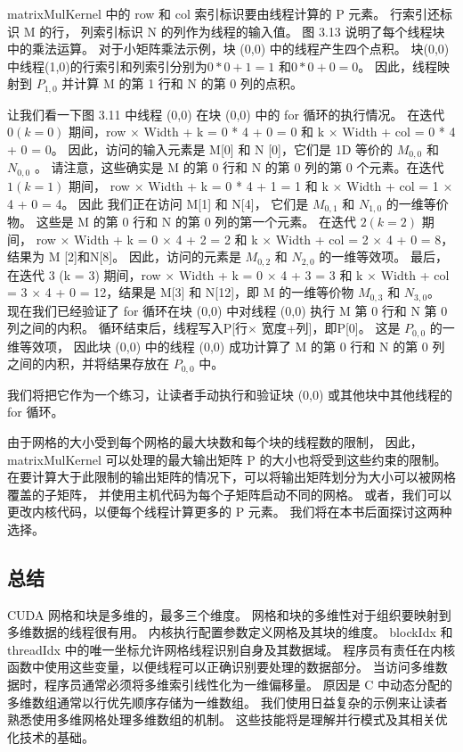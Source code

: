 matrixMulKernel 中的 row 和 col 索引标识要由线程计算的 P 元素。 行索引还标识 M 的行，
列索引标识 N 的列作为线程的输入值。 图 3.13 说明了每个线程块中的乘法运算。 
对于小矩阵乘法示例，块 (0,0) 中的线程产生四个点积。 块(0,0)中线程(1,0)的行索引和列索引分别为$0*0 + 1 = 1$
和$0 * 0 + 0 = 0$。 因此，线程映射到 $P_{1,0}$ 并计算 M 的第 1 行和 N 的第 0 列的点积。

让我们看一下图 3.11 中线程 (0,0) 在块 (0,0) 中的 for 循环的执行情况。 
在迭代 $0(k = 0)$ 期间，row $\times$ Width + k = 0 * 4 + 0 = 0 和 k $\times$ Width + col = 0 * 4 + 0 = 0。
因此，访问的输入元素是 M[0] 和 N [0]，它们是 1D 等价的 $M_{0,0}$ 和 $N_{0,0}$ 。 
请注意，这些确实是 M 的第 0 行和 N 的第 0 列的第 0 个元素。在迭代 $1(k = 1)$ 期间，
row $\times$ Width + k = 0 * 4 + 1 = 1 和 k $\times$ Width + col = 1 $\times$ 4 + 0 = 4。
因此 我们正在访问 M[1] 和 N[4]，
它们是 $M_{0,1}$ 和 $N_{1,0}$ 的一维等价物。 这些是 M 的第 0 行和 N 的第 0 列的第一个元素。
在迭代 $2(k = 2)$ 期间， row $\times$ Width + k = 0 $\times$ 4 + 2 = 2 
和 k $\times$ Width + col = 2 $\times$ 4 + 0 = 8，
结果为 M [2]和N[8]。 因此，访问的元素是 $M_{0,2}$ 和 $N_{2,0}$ 的一维等效项。
最后，在迭代 3 (k = 3) 期间，row $\times$ Width + k = 0 $\times$ 4 + 3 = 3 
和 k $\times$ Width + col = 3 $\times$ 4 + 0 = 12，结果是 M[3] 和 N[12]，即 M 的一维等价物 $M_{0,3}$ 和 $N_{3,0}$。 
现在我们已经验证了 for 循环在块 (0,0) 中对线程 (0,0) 执行 M 第 0 行和 N 第 0 列之间的内积。 
循环结束后，线程写入P[行$\times$ 宽度+列]，即P[0]。 这是 $P_{0,0}$ 的一维等效项，
因此块 (0,0) 中的线程 (0,0) 成功计算了 M 的第 0 行和 N 的第 0 列之间的内积，并将结果存放在 $P_{0,0}$ 中。

我们将把它作为一个练习，让读者手动执行和验证块 (0,0) 或其他块中其他线程的 for 循环。

由于网格的大小受到每个网格的最大块数和每个块的线程数的限制，
因此，matrixMulKernel 可以处理的最大输出矩阵 P 的大小也将受到这些约束的限制。 
在要计算大于此限制的输出矩阵的情况下，可以将输出矩阵划分为大小可以被网格覆盖的子矩阵，
并使用主机代码为每个子矩阵启动不同的网格。 或者，我们可以更改内核代码，以便每个线程计算更多的 P 元素。 
我们将在本书后面探讨这两种选择。

\subsection{总结}
CUDA 网格和块是多维的，最多三个维度。 网格和块的多维性对于组织要映射到多维数据的线程很有用。 
内核执行配置参数定义网格及其块的维度。 blockIdx 和 threadIdx 中的唯一坐标允许网格线程识别自身及其数据域。 
程序员有责任在内核函数中使用这些变量，以便线程可以正确识别要处理的数据部分。 
当访问多维数据时，程序员通常必须将多维索引线性化为一维偏移量。 
原因是 C 中动态分配的多维数组通常以行优先顺序存储为一维数组。 
我们使用日益复杂的示例来让读者熟悉使用多维网格处理多维数组的机制。 这些技能将是理解并行模式及其相关优化技术的基础。